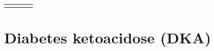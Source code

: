 \documentclass[]{article}
\begin{document}
\begin{table}[H]
\begin{raggedright}
\begin{threeparttable}
\begin{tabularx}{0.9\textwidth}{p{} p{} p{} p{}}
\hhline{}
\arrayrulecolor{black}
\end{tabularx}\end{threeparttable}
\par\end{raggedright}

\end{table}
 

\newpage

\hypertarget{diabetes-ketoacidose-dka}{%
\section{Diabetes ketoacidose (DKA)}\label{diabetes-ketoacidose-dka}}

 
  \providecommand{\huxb}[2]{\arrayrulecolor[RGB]{#1}\global\arrayrulewidth=#2pt}
  \providecommand{\huxvb}[2]{\color[RGB]{#1}\vrule width #2pt}
  \providecommand{\huxtpad}[1]{\rule{0pt}{\baselineskip+#1}}
  \providecommand{\huxbpad}[1]{\rule[-#1]{0pt}{#1}}
\end{document}
